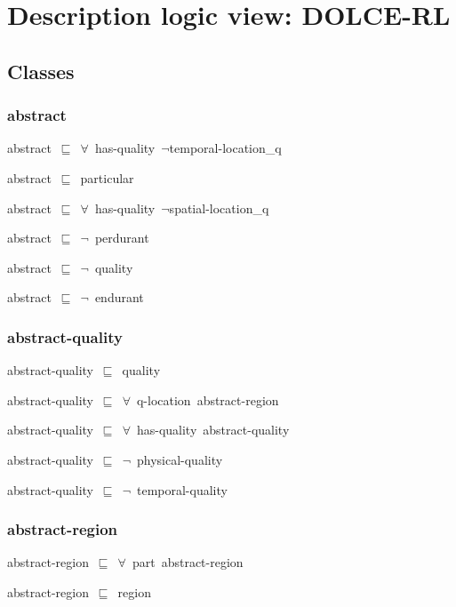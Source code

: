 \documentclass{article}
\begin{document}
\section*{Description logic view: DOLCE-RL}

\subsection*{Classes}

\subsubsection*{abstract}

abstract~\ensuremath{\sqsubseteq}~\ensuremath{\forall}~has-quality~\ensuremath{\lnot}temporal-location\_q~

abstract~\ensuremath{\sqsubseteq}~particular~

abstract~\ensuremath{\sqsubseteq}~\ensuremath{\forall}~has-quality~\ensuremath{\lnot}spatial-location\_q~

abstract~\ensuremath{\sqsubseteq}~\ensuremath{\lnot}~perdurant

abstract~\ensuremath{\sqsubseteq}~\ensuremath{\lnot}~quality

abstract~\ensuremath{\sqsubseteq}~\ensuremath{\lnot}~endurant

\subsubsection*{abstract-quality}

abstract-quality~\ensuremath{\sqsubseteq}~quality~

abstract-quality~\ensuremath{\sqsubseteq}~\ensuremath{\forall}~q-location~abstract-region~

abstract-quality~\ensuremath{\sqsubseteq}~\ensuremath{\forall}~has-quality~abstract-quality~

abstract-quality~\ensuremath{\sqsubseteq}~\ensuremath{\lnot}~physical-quality

abstract-quality~\ensuremath{\sqsubseteq}~\ensuremath{\lnot}~temporal-quality

\subsubsection*{abstract-region}

abstract-region~\ensuremath{\sqsubseteq}~\ensuremath{\forall}~part~abstract-region~

abstract-region~\ensuremath{\sqsubseteq}~region~
\end{document}
